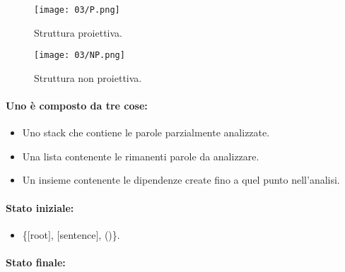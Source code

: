 

\begin{figure}[!h]
    \centering
    \texttt{[image: 03/P.png]}
    \caption{Struttura proiettiva.}
\end{figure}

\begin{figure}[!h]
    \centering
    \texttt{[image: 03/NP.png]}
    \caption{Struttura non proiettiva.}
\end{figure}



\paragraph{Uno  è composto da tre cose:}

\begin{itemize}
  \item Uno stack che contiene le parole parzialmente analizzate. 
  \item Una lista contenente le rimanenti parole da analizzare. 
  \item Un insieme contenente le dipendenze create fino a quel punto nell'analisi.
\end{itemize}

\paragraph{Stato iniziale:}

\begin{itemize}
\item \{$[$root$]$, $[$sentence$]$, ()\}.
\end{itemize}

\paragraph{Stato finale:}

